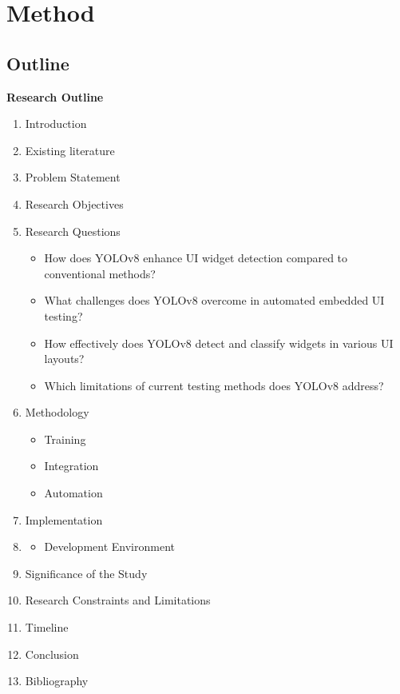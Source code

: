 \documentclass[Proposal,BIC,english,IEEE]{BASE/twbook} %
\begin{document}
\chapter{Method}
\section{Outline}
\begin{center}
    \Large{\textbf{Research Outline}}
\end{center}

\vspace{1cm} %

\begin{enumerate}
    \item Introduction
    \item Existing literature
    \item Problem Statement
    \item Research Objectives
    \item Research Questions
          \begin{itemize}
              \item How does YOLOv8 enhance UI widget detection compared to conventional methods?
              \item What challenges does YOLOv8 overcome in automated embedded UI testing?
              \item How effectively does YOLOv8 detect and classify widgets in various UI layouts?
              \item Which limitations of current testing methods does YOLOv8 address?
          \end{itemize}
    \item Methodology
          \begin{itemize}
              \item Training
              \item Integration
              \item Automation
          \end{itemize}
    \item Implementation
    \item \begin{itemize}
              \item Development Environment
          \end{itemize}
    \item Significance of the Study
    \item Research Constraints and Limitations
    \item Timeline
    \item Conclusion
    \item Bibliography
\end{enumerate}
\newpage
\end{document}
